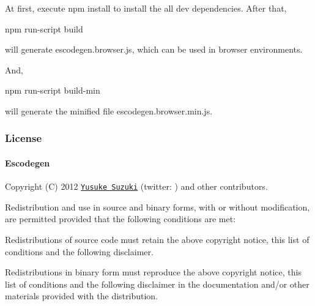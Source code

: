 At first, execute {\ttfamily npm install} to install the all dev dependencies. After that, \begin{DoxyVerb}npm run-script build
\end{DoxyVerb}


will generate {\ttfamily escodegen.\+browser.\+js}, which can be used in browser environments.

And, \begin{DoxyVerb}npm run-script build-min
\end{DoxyVerb}


will generate the minified file {\ttfamily escodegen.\+browser.\+min.\+js}.

\subsubsection*{License}

\paragraph*{Escodegen}

Copyright (C) 2012 \href{http://github.com/Constellation}{\tt Yusuke Suzuki} (twitter\+: \href{http://twitter.com/Constellation}{\tt }) and other contributors.

Redistribution and use in source and binary forms, with or without modification, are permitted provided that the following conditions are met\+:


\begin{DoxyItemize}
\item Redistributions of source code must retain the above copyright notice, this list of conditions and the following disclaimer.
\item Redistributions in binary form must reproduce the above copyright notice, this list of conditions and the following disclaimer in the documentation and/or other materials provided with the distribution.
\end{DoxyItemize}


